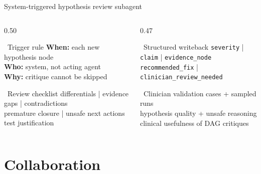 \documentclass[aspectratio=169,t]{beamer}
\begin{document}
\begin{frame}{System-triggered hypothesis review subagent}
  \vspace{-0.4mm}
  \begin{columns}[T,onlytextwidth]
    \begin{column}{0.50\textwidth}
      \begin{block}{\faRobot\;\, Trigger rule}
        \scriptsize
        \textbf{When:} each new hypothesis node\\[-0.2mm]
        \textbf{Who:} system, not acting agent\\[-0.2mm]
        \textbf{Why:} critique cannot be skipped
      \end{block}
      \begin{alertblock}{\faSearch\;\, Review checklist}
        \scriptsize
        differentials \;|\; evidence gaps \;|\; contradictions\\[-0.2mm]
        premature closure \;|\; unsafe next actions\\[-0.2mm]
        test justification
      \end{alertblock}
    \end{column}%
    \hfill
    \begin{column}{0.47\textwidth}
      \begin{exampleblock}{\faPen\;\, Structured writeback}
        \scriptsize
        \texttt{severity} \;|\; \texttt{claim} \;|\; \texttt{evidence\_node}\\[-0.2mm]
        \texttt{recommended\_fix} \;|\; \texttt{clinician\_review\_needed}
      \end{exampleblock}
      \begin{block}{\faUserMd\;\, Clinician validation}
        \scriptsize
        cases + sampled runs\\[-0.2mm]
        hypothesis quality + unsafe reasoning\\[-0.2mm]
        clinical usefulness of DAG critiques
      \end{block}
    \end{column}
  \end{columns}
\end{frame}

\section{Collaboration}
\end{document}
